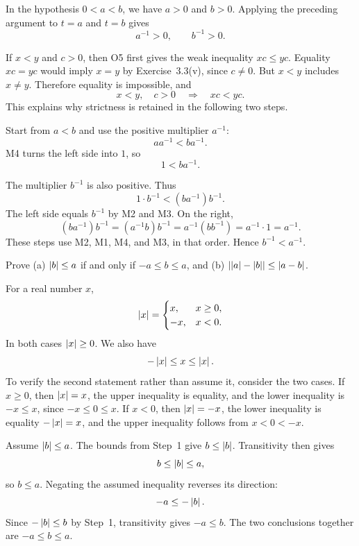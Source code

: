 In the hypothesis $0<a<b$, we have $a>0$ and $b>0$.
Applying the preceding argument to $t=a$ and $t=b$ gives
\[
 a^{-1}>0,\qquad b^{-1}>0.
\]

If $x<y$ and $c>0$, then O5 first gives the weak inequality $xc\le yc$.
Equality $xc=yc$ would imply $x=y$ by Exercise~3.3(v), since $c\ne0$.
But $x<y$ includes $x\ne y$. Therefore equality is impossible, and
\[
 x<y,\quad c>0\quad\Longrightarrow\quad xc<yc.
\]
This explains why strictness is retained in the following two steps.

Start from $a<b$ and use the positive multiplier $a^{-1}$:
\[
 aa^{-1}<ba^{-1}.
\]
M4 turns the left side into $1$, so
\[
 1<ba^{-1}.
\]

The multiplier $b^{-1}$ is also positive. Thus
\[
 1\cdot b^{-1}<(ba^{-1})b^{-1}.
\]
The left side equals $b^{-1}$ by M2 and M3. On the right,
\[
 (ba^{-1})b^{-1}
   =(a^{-1}b)b^{-1}
   =a^{-1}(bb^{-1})
   =a^{-1}\cdot1
   =a^{-1}.
\]
These steps use M2, M1, M4, and M3, in that order. Hence
$b^{-1}<a^{-1}$.



\goal Prove (a) $\left|b\right|\le a$ if and only if $-a\le b\le a$, and
(b) $\left|\left|a\right|-\left|b\right|\right|\le\left|a-b\right|$.

For a real number $x$,
\[
 \left|x\right|=\begin{cases}x,&x\ge0,\\-x,&x<0.\end{cases}
\]
In both cases $\left|x\right|\ge0$. We also have
\[
 -\left|x\right|\le x\le\left|x\right|.
\]
To verify the second statement rather than assume it, consider the two
cases. If $x\ge0$, then $\left|x\right|=x$, the upper inequality is equality,
and the lower inequality is $-x\le x$, since $-x\le0\le x$.
If $x<0$, then $\left|x\right|=-x$, the lower inequality is equality
$-\left|x\right|=x$, and the upper inequality follows from $x<0<-x$.

Assume $\left|b\right|\le a$. The bounds from Step~1 give $b\le\left|b\right|$.
Transitivity then gives
\[
 b\le\left|b\right|\le a,
\]
so $b\le a$. Negating the assumed inequality reverses its direction:
\[
 -a\le-\left|b\right|.
\]
Since $-\left|b\right|\le b$ by Step~1, transitivity gives $-a\le b$.
The two conclusions together are $-a\le b\le a$.

